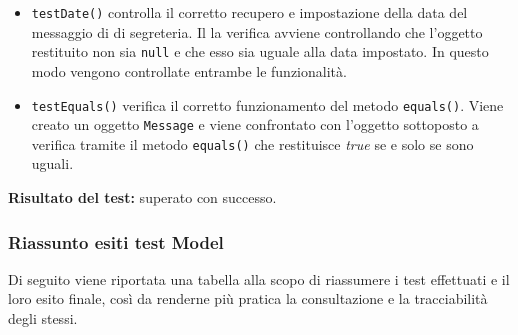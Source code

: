 \begin{itemize}
\begin{itemize}
\item \texttt{testDate()} controlla il corretto recupero e impostazione della data del messaggio di di segreteria.
Il la verifica avviene controllando che l'oggetto restituito non sia \texttt{null} e che esso sia uguale alla data impostato. In questo modo vengono controllate entrambe le funzionalità. 


\item \texttt{testEquals()}
verifica il corretto funzionamento del metodo \texttt{equals()}. Viene creato un oggetto \texttt{Message} e viene confrontato con l'oggetto sottoposto a verifica tramite il metodo \texttt{equals()} che restituisce \textit{true} se e solo se sono uguali.
 
\end{itemize}
\textbf{Risultato del test:} superato con successo.
\end{itemize}







\subsubsection{Riassunto esiti test Model}
Di seguito viene riportata una tabella alla scopo di riassumere i test effettuati e il loro esito finale, così da renderne più pratica la consultazione e la tracciabilità degli stessi.

